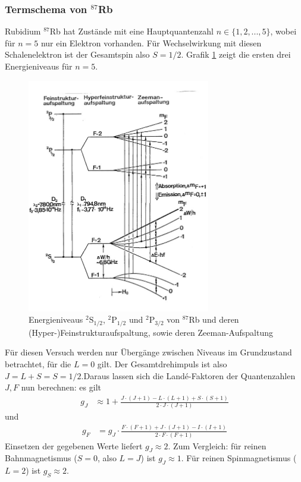 \documentclass[../1-Grundlagenteil.tex]{subfiles}
\begin{document}
\subsubsection*{Termschema von $^{87}$Rb}
    Rubidium $^{87}$Rb hat Zustände mit eine Hauptquantenzahl $n\in\{1,2,...,5\}$, wobei für $n=5$ nur ein Elektron vorhanden. Für Wechselwirkung mit diesen Schalenelektron ist der Gesamtspin also $S=1/2$. Grafik \ref{fig:Rb87Termschema} zeigt die ersten drei Energieniveaus für $n=5$.

    \begin{figure}[H]
        \centering
        \includegraphics[width=8cm]{../../Bilddateien/Grundlagen/Rb87Termschema.jpg}
        \caption{Energieniveaus $^2\text{S}_{1/2}$, $^2\text{P}_{1/2}$ und $^2\text{P}_{3/2}$ von $^{87}$Rb und deren (Hyper-)Feinstrukturaufspaltung, sowie deren Zeeman-Aufspaltung \cite[p.171]{Schneider}}
        \label{fig:Rb87Termschema}
    \end{figure}

    Für diesen Versuch werden nur Übergänge zwischen Niveaus im Grundzustand betrachtet, für die $L=0$ gilt. Der Gesamtdrehimpuls ist also $J=L+S=S=1/2$.Daraus lassen sich die Landé-Faktoren der Quantenzahlen $J,F$ nun berechnen: es gilt
    \begin{align*}
        g_J &\approx 1 + \frac{J\cdot(J + 1) - L\cdot(L + 1) + S\cdot (S + 1)}{2\cdot J\cdot (J + 1)}
    \end{align*}
    und 
    \begin{align*}
        g_F &= g_J\cdot \frac{F\cdot(F + 1) + J\cdot(J + 1) - I\cdot (I + 1)}{2\cdot F\cdot (F + 1)}
    \end{align*}
    Einsetzen der gegebenen Werte liefert $g_J \approx 2$. Zum Vergleich: für reinen Bahnmagnetismus ($S=0$, also $L=J$) ist $g_J\approx 1$. Für reinen Spinmagnetismus ($L=2$) ist $g_S\approx 2$.\\
\end{document}
